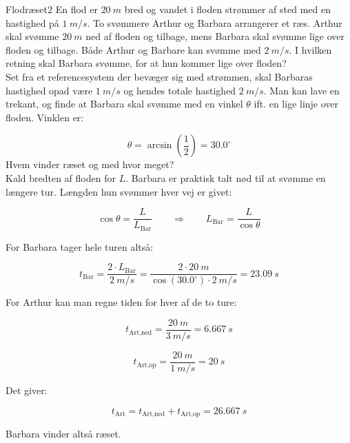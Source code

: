 \begin{opgave}{Flodræset}{2}
	En flod er $\SI{20}{m}$ bred og vandet i floden strømmer af sted med en hastighed på $\SI{1}{m/s}$. To svømmere Arthur og Barbara arrangerer et ræs. Arthur skal svømme $\SI{20}{m}$ ned af floden og tilbage, mens Barbara skal svømme lige over floden og tilbage. Både Arthur og Barbare kan svømme med $\SI{2}{m/s}$.
	\opg I hvilken retning skal Barbara svømme, for at hun kommer lige over floden?\\
	
	Set fra et referencesystem der bevæger sig med strømmen, skal Barbaras hastighed opad være $\SI{1}{m/s}$ og hendes totale hastighed $\SI{2}{m/s}$. Man kan lave en trekant, og finde at Barbara skal svømme med en vinkel $\theta$ ift. en lige linje over floden. Vinklen er:
	
	$$\theta = \arcsin \left( \frac{1}{2} \right) = 30.0^\circ$$
	\opg Hvem vinder ræset og med hvor meget?\\
	
	Kald bredten af floden for $L$. Barbara er praktisk talt nød til at svømme en længere tur. Længden hun svømmer hver vej er givet:
	
	$$\cos \theta = \frac{L}{L_{\text{Bar}}} \quad \quad \Rightarrow \quad \quad L_{\text{Bar}} = \frac{L}{\cos \theta}  $$
	
	\vspace{2mm}
	
	For Barbara tager hele turen altså:
	
	$$t_{\text{Bar}} = \frac{2 \cdot L_{\text{Bar}}}{\SI{2}{m/s}} = \frac{2 \cdot \SI{20}{m}}{\cos \left( 30.0^\circ \right) \cdot \SI{2}{m/s}} = \SI{23.09}{s}$$
	
	\vspace{2mm}
	
	For Arthur kan man regne tiden for hver af de to ture:
	
	$$t_{\text{Art,ned}} = \frac{\SI{20}{m}}{\SI{3}{m/s}} = \SI{6.667}{s}$$
	
	$$t_{\text{Art,op}} = \frac{\SI{20}{m}}{\SI{1}{m/s}} = \SI{20}{s}$$
	
	\vspace{2mm}
	
	Det giver:
	
	$$t_{\text{Art}} = t_{\text{Art,ned}} + t_{\text{Art,op}} = \SI{26.667}{s}$$
	
	\vspace{2mm}
	
	Barbara vinder altså ræset.
\end{opgave}


